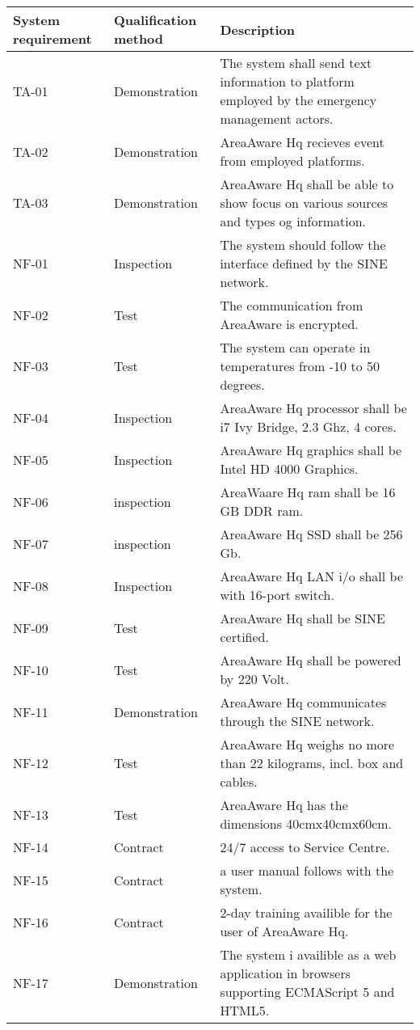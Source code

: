 \begin{longtable}{| p{2.4cm}  | p{2.6cm} | p{6.6cm} |  }
	\hline
	\textbf{System requirement}	& \textbf{Qualification method} & \textbf{Description} \\ \hline
	TA-01	& Demonstration	& The system shall send text information to platform employed by the emergency management actors. \\ \hline
	TA-02	& Demonstration	& AreaAware Hq recieves event  from employed platforms. \\ \hline
	TA-03	& Demonstration	& AreaAware Hq shall be able to show focus on various sources and types og information. \\ \hline
	NF-01	& Inspection	& The system should follow the interface defined by the SINE network. \\ \hline
	NF-02	& Test			& The communication from AreaAware is encrypted. \\ \hline
	NF-03	& Test			& The system can operate in temperatures from -10 to 50 degrees. \\ \hline
	NF-04	& Inspection	& AreaAware Hq processor shall be i7 Ivy Bridge, 2.3 Ghz, 4 cores. \\ \hline
	NF-05	& Inspection	& AreaAware Hq graphics shall be Intel HD 4000 Graphics. \\ \hline
	NF-06	& inspection	& AreaWaare Hq ram shall be 16 GB DDR ram. \\ \hline
	NF-07	& inspection	& AreaAware Hq SSD shall be 256 Gb. \\ \hline
	NF-08	& Inspection	& AreaAware Hq LAN i/o shall be with 16-port switch. \\ \hline
	NF-09	& Test			& AreaAware Hq shall be SINE certified. \\ \hline
	NF-10	& Test			& AreaAware Hq shall be powered by 220 Volt. \\ \hline
	NF-11	& Demonstration	& AreaAware Hq communicates through the SINE network. \\ \hline
	NF-12	& Test			& AreaAware Hq  weighs no more than 22 kilograms, incl. box and cables. \\ \hline
	NF-13	& Test			& AreaAware Hq has the dimensions 40cmx40cmx60cm. \\ \hline
	NF-14	& Contract		& 24/7 access to Service Centre. \\ \hline
	NF-15	& Contract		& a user manual follows with the system. \\ \hline
	NF-16	& Contract		& 2-day training availible for the user of AreaAware Hq. \\ \hline
	NF-17	& Demonstration	& The system i availible as a web application in browsers supporting ECMAScript 5 and HTML5. \\ \hline
	
\end{longtable}
